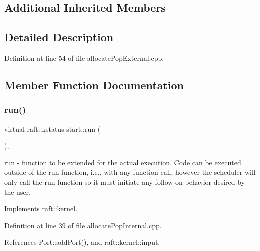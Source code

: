 \subsection*{Additional Inherited Members}


\subsection{Detailed Description}


Definition at line 54 of file allocate\+Pop\+External.\+cpp.



\subsection{Member Function Documentation}
\hypertarget{classstart_a4c076d756e2846f51e54452853a9ed6d}{}\label{classstart_a4c076d756e2846f51e54452853a9ed6d} 
\subsubsection{\texorpdfstring{run()}{run()}\hspace{0.1cm}{\footnotesize\ttfamily [1/6]}}
{\footnotesize\ttfamily virtual raft\+::kstatus start\+::run (\begin{DoxyParamCaption}{ }\end{DoxyParamCaption})\hspace{0.3cm}{\ttfamily [inline]}, {\ttfamily [virtual]}}

run -\/ function to be extended for the actual execution. Code can be executed outside of the run function, i.\+e., with any function call, however the scheduler will only call the run function so it must initiate any follow-\/on behavior desired by the user. 

Implements \hyperlink{classraft_1_1kernel_a05094286d7577360fb1b91c91fc05901}{raft\+::kernel}.



Definition at line 39 of file allocate\+Pop\+Internal.\+cpp.



References Port\+::add\+Port(), and raft\+::kernel\+::input.


